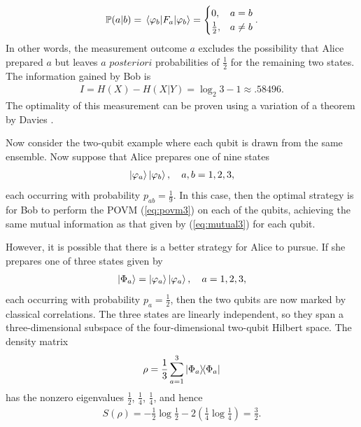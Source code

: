 \documentclass[a4paper, 12pt]{article}
\numberwithin{equation}{section}
\numberwithin{figure}{section}
\theoremstyle{definition}
\begin{document}
    \begin{align}
        \mathbb{P}(a | b) = \matrixel{\varphi_b}{F_a}{\varphi_b} = \begin{cases}
            0, & a = b \\
            \frac{1}{2}, & a \neq b
        \end{cases}.
    \end{align}
    In other words, the measurement outcome $a$ excludes the possibility that Alice prepared $a$ but leaves $\textit{a posteriori}$ probabilities of $\frac{1}{2}$ for the remaining two states. The information gained by Bob is
    \begin{align}
        I = H(X) - H(X | Y) = \log_2 3 - 1 \approx .58496. \label{eq:mutual3}
    \end{align}
    The optimality of this measurement can be proven using a variation of a theorem by Davies \cite{preskill}. \par
    Now consider the two-qubit example where each qubit is drawn from the same ensemble. Now suppose that Alice prepares one of nine states
    \begin{align}
        \ket{\varphi_a} \ket{\varphi_b}, \quad a, b = 1, 2, 3,
    \end{align}
    each occurring with probability $p_{ab} = \frac{1}{9}$. In this case, then the optimal strategy is for Bob to perform the POVM (\ref{eq:povm3}) on each of the qubits, achieving the same mutual information as that given by (\ref{eq:mutual3}) for each qubit. \par
    However, it is possible that there is a better strategy for Alice to pursue. If she prepares one of three states given by
    \begin{align}
        \ket{\Phi_a} = \ket{\varphi_a} \ket{\varphi_a}, \quad a = 1, 2, 3, \label{better3}
    \end{align}
    each occurring with probability $p_a = \frac{1}{2}$, then the two qubits are now marked by classical correlations. The three states are linearly independent, so they span a three-dimensional subspace of the four-dimensional two-qubit Hilbert space. The density matrix
    \begin{align}
        \rho = \frac{1}{3} \sum_{a = 1}^3 \dyad{\Phi_a}{\Phi_a}
    \end{align}
    has the nonzero eigenvalues $\frac{1}{2}$, $\frac{1}{4}$, $\frac{1}{4}$, and hence
    \begin{align}
        S(\rho) = -\frac{1}{2} \log \frac{1}{2} - 2 \left( \frac{1}{4} \log \frac{1}{4} \right) = \frac{3}{2}.
    \end{align}
\end{document}
